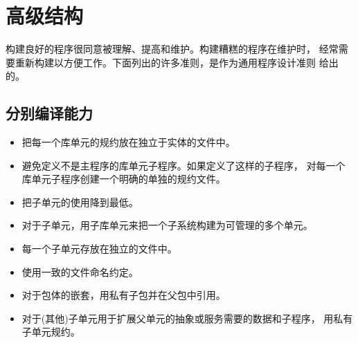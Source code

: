 %
%
%

\section{高级结构}
\begin{blockindent}
构建良好的程序很同意被理解、提高和维护。构建糟糕的程序在维护时，
经常需要重新构建以方便工作。下面列出的许多准则，是作为通用程序设计准则
给出的。
\end{blockindent}

\subsection{分别编译能力}
\begin{itemize}
\item 把每一个库单元的规约放在独立于实体的文件中。
\item 避免定义不是主程序的库单元子程序。如果定义了这样的子程序，
对每一个库单元子程序创建一个明确的单独的规约文件。
\item 把子单元的使用降到最低。
\item 对于子单元，用子库单元来把一个子系统构建为可管理的多个单元。
\item 每一个子单元存放在独立的文件中。
\item 使用一致的文件命名约定。
\item 对于包体的嵌套，用私有子包并在父包中引用。
\item 对于(其他)子单元用于扩展父单元的抽象或服务需要的数据和子程序，
 用私有子单元规约。
\end{itemize}

